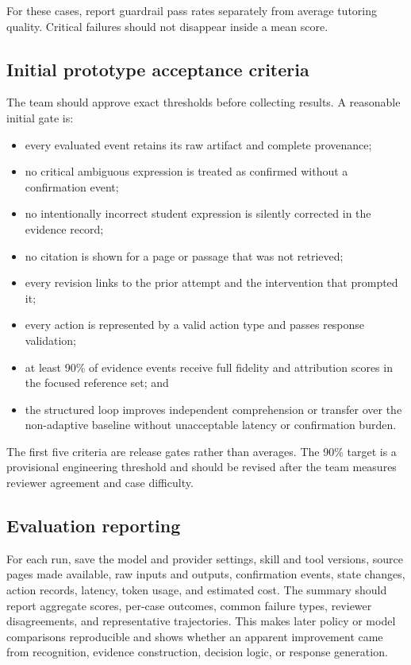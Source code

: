 \documentclass[11pt]{article}
\begin{document}
For these cases, report guardrail pass rates separately from average tutoring quality. Critical failures should not disappear inside a mean score.

\subsection{Initial prototype acceptance criteria}

The team should approve exact thresholds before collecting results. A reasonable initial gate is:

\begin{itemize}
    \item every evaluated event retains its raw artifact and complete provenance;
    \item no critical ambiguous expression is treated as confirmed without a confirmation event;
    \item no intentionally incorrect student expression is silently corrected in the evidence record;
    \item no citation is shown for a page or passage that was not retrieved;
    \item every revision links to the prior attempt and the intervention that prompted it;
    \item every action is represented by a valid action type and passes response validation;
    \item at least 90\% of evidence events receive full fidelity and attribution scores in the focused reference set; and
    \item the structured loop improves independent comprehension or transfer over the non-adaptive baseline without unacceptable latency or confirmation burden.
\end{itemize}

The first five criteria are release gates rather than averages. The 90\% target is a provisional engineering threshold and should be revised after the team measures reviewer agreement and case difficulty.

\subsection{Evaluation reporting}

For each run, save the model and provider settings, skill and tool versions, source pages made available, raw inputs and outputs, confirmation events, state changes, action records, latency, token usage, and estimated cost. The summary should report aggregate scores, per-case outcomes, common failure types, reviewer disagreements, and representative trajectories. This makes later policy or model comparisons reproducible and shows whether an apparent improvement came from recognition, evidence construction, decision logic, or response generation.
\end{document}
